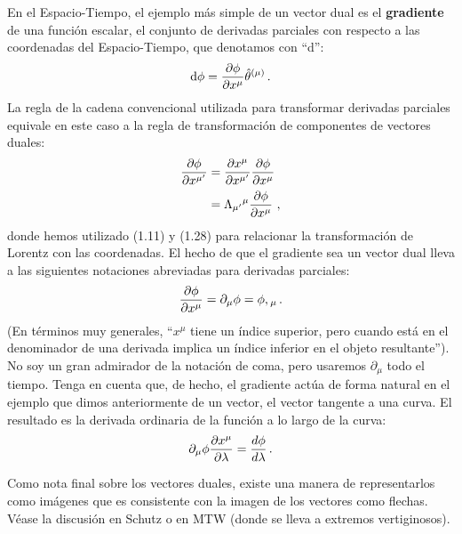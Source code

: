 \documentclass[11pt,b5paper,openany,twoside]{book}
\newcommand{\ztheta}[1]{{\hat{\theta}}^{(#1)}}
\newcommand{\p}[1]{{\partial_{#1}}}
\begin{document}
En el Espacio-Tiempo, el ejemplo más simple de un vector dual es el {\bf gradiente} de una función escalar, el conjunto de derivadas parciales con respecto a las coordenadas del Espacio-Tiempo, que denotamos con ``d'':
\begin{equation}
{\rm d}\phi = {{\p{}\phi}\over{\p{}x^\mu}}  \ztheta{\mu}\,.\label{1.40}
\end{equation}
La regla de la cadena convencional utilizada para transformar derivadas parciales equivale en este caso a la regla de transformación de componentes de vectores duales:
\begin{align}
{{\p{}\phi}\over{\p{}x^{\mu'}}} &=
{{\p{}x^\mu}\over{\p{}x^{\mu'}}}{{\p{}\phi}\over{\p{}x^\mu}}\nonumber \\
&= \Lambda_{\mu'}{}^\mu {{\p{}\phi}\over{\p{}x^\mu}}\ ,
\label{1.41}
\end{align}
donde hemos utilizado (1.11) y (1.28) para relacionar la transformación de Lorentz con las coordenadas.
El hecho de que el gradiente sea un vector dual lleva a las siguientes notaciones abreviadas para derivadas parciales:
\begin{equation}
{{\p{}\phi}\over{\p{}x^\mu}}=\p\mu\phi = \phi,{}_\mu
\,.\label{1.42}
\end{equation}
(En términos muy generales, ``$x^\mu$ tiene un índice superior, pero cuando está en el denominador de una derivada implica un índice inferior en el objeto resultante''). No soy un gran admirador de la notación de coma, pero usaremos $\p\mu$ todo el tiempo.
Tenga en cuenta que, de hecho, el gradiente actúa de forma natural en el ejemplo que dimos anteriormente de un vector, el vector tangente a una curva.
El resultado es la derivada ordinaria de la función a lo largo de la curva:
\begin{equation}
\p\mu\phi {{\partial x^\mu}\over{\partial \lambda}}
= {{d\phi}\over{d\lambda}}\,.\label{1.43}
\end{equation}

Como nota final sobre los vectores duales, existe una manera de representarlos como imágenes que es consistente con la imagen de los vectores como flechas.
Véase la discusión en Schutz o en MTW (donde se lleva a extremos vertiginosos).
\end{document}

